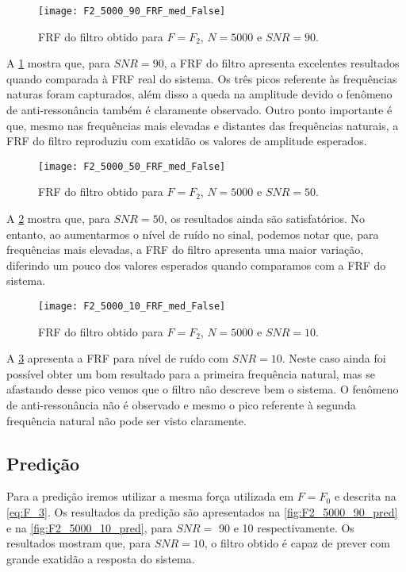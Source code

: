 \begin{figure}
	\centering
	\texttt{[image: F2\_5000\_90\_FRF\_med\_False]}
	\caption{FRF do filtro obtido para $ F=F_2 $, $ N=5000 $ e $ SNR=90 $.}
	\label{fig:F2_5000_90_FRF_med_False}
\end{figure}

A \cref{fig:F2_5000_90_FRF_med_False} mostra que, para $ SNR=90 $, a FRF do filtro apresenta excelentes resultados quando comparada à FRF real do sistema. Os três picos referente às frequências naturas foram capturados, além disso a queda na amplitude devido o fenômeno de anti-ressonância também é claramente observado. Outro ponto importante é que, mesmo nas frequências mais elevadas e distantes das frequências naturais, a FRF do filtro reproduziu com exatidão os valores de amplitude esperados.

\begin{figure}
	\centering
	\texttt{[image: F2\_5000\_50\_FRF\_med\_False]}
	\caption{FRF do filtro obtido para $ F=F_2 $, $ N=5000 $ e $ SNR=50 $.}
	\label{fig:F2_5000_50_FRF_med_False}
\end{figure}

A \cref{fig:F2_5000_50_FRF_med_False} mostra que, para $ SNR=50 $, os resultados ainda são satisfatórios. No entanto, ao aumentarmos o nível de ruído no sinal, podemos notar que, para frequências mais elevadas, a FRF do filtro apresenta uma maior variação, diferindo um pouco dos valores esperados quando comparamos com a FRF do sistema.

\begin{figure}
	\centering
	\texttt{[image: F2\_5000\_10\_FRF\_med\_False]}
	\caption{FRF do filtro obtido para $ F=F_2 $, $ N=5000 $ e $ SNR=10 $.}
	\label{fig:F2_5000_10_FRF_med_False}
\end{figure}

A \cref{fig:F2_5000_10_FRF_med_False} apresenta a FRF para nível de ruído com $ SNR=10 $. Neste caso ainda foi possível obter um bom resultado para a primeira frequência natural, mas se afastando desse pico vemos que o filtro não descreve bem o sistema. O fenômeno de anti-ressonância não é observado e mesmo o pico referente à segunda frequência natural não pode ser visto claramente.

\subsection{Predição}

Para a predição iremos utilizar a mesma força utilizada em $ F=F_0 $ e descrita na \cref{eq:F_3}. Os resultados da predição são apresentados na \cref{fig:F2_5000_90_pred} e na \cref{fig:F2_5000_10_pred}, para $ SNR= $ 90 e 10 respectivamente. Os resultados mostram que, para $ SNR=10 $, o filtro obtido é capaz de prever com grande exatidão a resposta do sistema.

